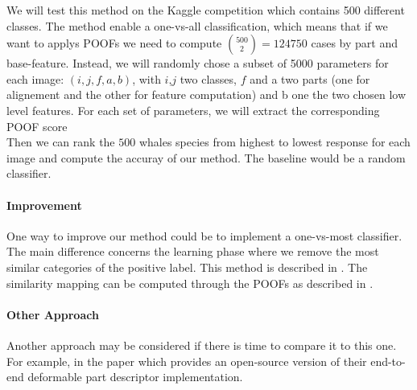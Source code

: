\documentclass[11pt,a4paper,oneside]{report}
\begin{document}
We will test this method on the Kaggle competition which contains 500 different classes. The method enable a one-vs-all classification, which means that if we want to applys POOFs we need to compute $\binom{500}{2} = 124 750$ cases by part and base-feature. Instead, we will randomly chose a subset of 5000 parameters for each image: $(i,j,f,a,b)$, with $i$,$j$ two classes, $f$ and a two parts (one for alignement and the other for feature computation) and b one the two chosen low level features. For each set of parameters, we will extract the corresponding POOF score\\

Then we can rank the $500$ whales species from highest to lowest response for each image and compute the accuray of our method. The baseline would be a random classifier. 

\paragraph{Improvement}

One way to improve our method could be to implement a one-vs-most classifier. The main difference concerns the learning phase where we remove the most similar categories of the positive label. This method is described in \citep{berg-birdsnap-cvpr2014}. The similarity mapping can be computed through the POOFs as described in \citep{berg-blackbird-iccv2013}.

\paragraph{Other Approach}

Another approach may be considered if there is time to compare it to this one. For example, in the paper \cite{Zhang_2013_ICCV} which provides an open-source version of their end-to-end deformable part descriptor implementation.
\end{document}
